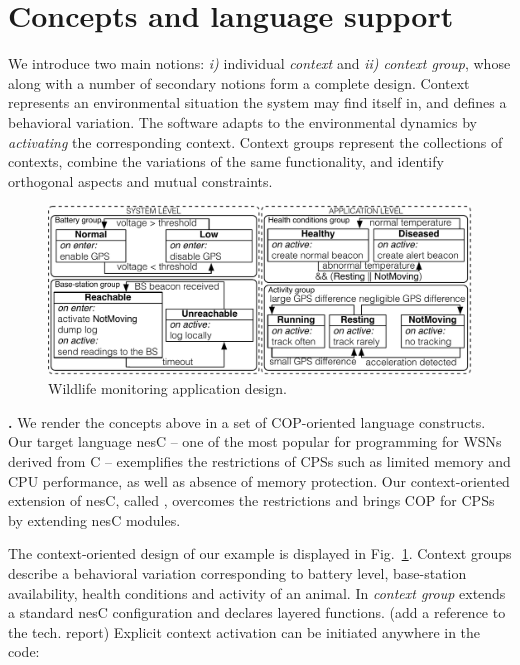 \section{Concepts and language support}

We introduce two main notions: \emph{i)} individual \emph{context} and \emph{ii)
context group}, whose along with a number of secondary notions form a complete
design. Context represents an environmental situation the system may find itself
in, and defines a behavioral variation. The software adapts to the environmental
dynamics by \emph{activating} the corresponding context. Context groups
represent the collections of contexts, combine the variations of the same
functionality, and identify orthogonal aspects and mutual constraints.

\begin{figure}
\begin{center}
\includegraphics[scale=.45]{imgs/wildlifetracking}
\vspace{-1mm}
\caption{Wildlife monitoring application design.}
  \label{fig:design}
\vspace{-9mm}
\end{center}
\end{figure}

{\bf \conesc.} We render the concepts above in a set of COP-oriented language
constructs. Our target language nesC -- one of the most popular for programming
for WSNs derived from C -- exemplifies the restrictions of CPSs such as limited
memory and CPU performance, as well as absence of memory protection. Our
context-oriented extension of nesC, called \conesc, overcomes the restrictions
and brings COP for CPSs by extending nesC modules.

The context-oriented design of our example is displayed in
Fig.~\ref{fig:design}. Context groups describe a behavioral variation
corresponding to battery level, base-station availability, health conditions and
activity of an animal. In \conesc \emph{context group} extends a standard nesC
configuration and declares layered functions. (add a reference to the tech.
report) Explicit context activation can be initiated anywhere in the code:

